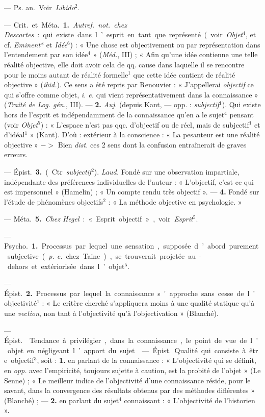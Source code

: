 \begin{itemize}[leftmargin=1cm, label=, itemsep=1pt]
 — \si{Ps. an.} Voir {\it Libido}$^2$.

 — \si{Crit.} et \si{Méta.} {\bf 1.} {\it Autref.} {\it not.}
{\it chez Descartes} : qui existe dans l’esprit en tant que représenté (voir
{\it Objet}$^4$, et cf. {\it Eminent}* et {\it Idée}$^6$) : « Une chose est
objectivement ou par représentation dans l’entendement par son idée$^4$
» ({\it Méd.}, III) ; « Afin qu’une idée contienne une telle réalité
objective, elle doit avoir cela de qq. cause dans laquelle il se rencontre
pour le moins autant de réalité formelle$^1$ que cette idée contient
de réalité objective » ({\it ibid.}). Ce sens a été repris par Renouvier : «
J’appellerai {\it objectif} ce qui s’offre comme objet, {\it i. e.} qui vient
représentativement dans la connaissance » ({\it Traité de Log. gén.}, III).
—  {\bf 2.} {\it Auj.} (depuis Kant, — opp. : {\it subjectif}$^1$). Qui
existe hors de l'esprit et indépendamment de la connaissance qu’en a le
sujet$^4$ pensant (voir {\it Objet}$^5$) : « L’espace n’est pas qqc.
d'objectif ou de réel, mais de subjectif$^1$ et d’idéal$^1$ » (Kant). D'où :
extérieur à la conscience : « La pesanteur est une réalité objective » $->$
Bien {\it dist.} ces 2 sens dont la confusion entraînerait de graves erreurs.

— \si{Épist.} {\bf 3.} (Ctr. {\it subjectif}$^2$). {\it Laud.} Fondé sur une
observation impartiale, indépendante des préférences individuelles de
l’auteur : « L'objectif, c’est ce qui est impersonnel » (Hamelin) ; « Un
compte rendu très objectif ». — {\bf 4.} Fondé sur l'étude de phénomènes
objectifs$^2$ : « La méthode objective en psychologie. »

— \si{Méta.} {\bf 5.} {\it Chez Hegel} : « Esprit
objectif », voir {\it Esprit}$^5$.

 — \si{Psycho.} {\bf 1.} Processus par lequel une
sensation, supposée d’abord purement subjective ({\it p. e.} chez Taine), se
trouverait projetée au-dehors et extériorisée dans l’objet$^5$.

— \si{Épist.} {\bf 2.} Processus par lequel la connaissance s'approche sans
cesse de l’objectivité$^1$ : « Le critère cherché s’appliquera moins à une
qualité statique qu’à une {\it vection}, non tant à l’objectivité qu’à
l’objectivation » (Blanché).

 — \si{Épist.}  Tendance à privilégier, dans
la connaissance, le point de vue de l’objet en négligeant l’apport du sujet.

 — \si{Épist.} Qualité qui consiste à être objectif$^3$,
soit : {\bf 1.} en parlant de la connaissance : « L'objectivité qui se
définit, en {\it opp.} avec l'empiricité, toujours sujette à caution, est la
probité de l’objet » (Le Senne) ; « Le meilleur indice de l’objectivité d’une
connaissance réside, pour le savant, dans la convergence des résultats
obtenus par des méthodes diflérentes » (Blanché) ; —  {\bf 2.} en parlant du
sujet$^4$ connaissant : « L’objectivité de l'historien ».


\end{itemize}
